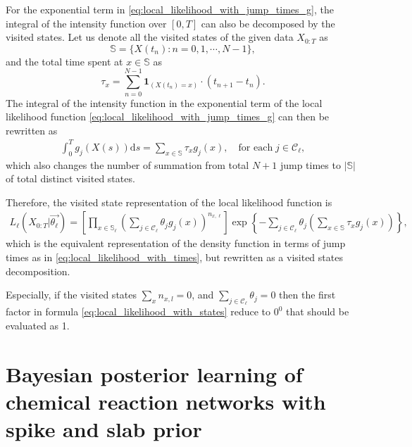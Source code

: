 \documentclass[pdflatex,sn-mathphys-num]{sn-jnl}%
\def\dd{\text{d}}
\theoremstyle{thmstyleone}%
\theoremstyle{thmstyletwo}%
\theoremstyle{thmstylethree}%
\begin{document}
For the exponential term in \eqref{eq:local_likelihood_with_jump_times_g}, the integral of the intensity function over $[0, T]$ can also be decomposed by the visited states. Let us denote all the visited states of the given data $X_{0:T}$ as 
\[\mathbb{S} = \{ X(t_n): n = 0, 1, \cdots, N-1 \},\] 
and the total time spent at $x \in \mathbb{S}$ as 
\[
\tau_{x} = \sum_{n=0}^{N-1} \mathbf{1}_{(X(t_n) = x)} \cdot (t_{n+1} - t_n).
\]
The integral of the intensity function in the exponential term of the local likelihood function \eqref{eq:local_likelihood_with_jump_times_g} can then be rewritten as
\begin{align}
    \int_0^T g_{j}(X(s))\dd s = \sum_{x \in \mathbb{S} } \tau_x  g_{j}(x) ,\quad \text{for each}\; j \in \mathcal{C}_{\ell},
\end{align} 
which also changes the number of summation from total $N+1$ jump times to $\left|\mathbb{S}\right|$ of total distinct visited states. 

Therefore, the visited state representation of the local likelihood function is 
\begin{equation}
    \begin{aligned}
    L_{\ell}\left(X_{0:T} \big| \overrightarrow{\theta_\ell}\right) = \left[\prod_{x \in \mathbb{S}_\ell}  \left(  \sum_{j \in \mathcal{C}_\ell } \theta_{j} g_{j} \left( x\right) \right)^{n_{x, \ell}} \right] 
\exp\left\{ -  \sum_{j \in \mathcal{C}_\ell } \theta_{j} \left(   \sum_{x \in \mathbb{S}} \tau_{x}  g_{j}(x)    \right) \right\} ,
\label{eq:local_likelihood_with_states}
\end{aligned}
\end{equation}
which is the equivalent representation of the density function in terms of jump times as in \eqref{eq:local_likelihood_with_times}, but rewritten as a visited states decomposition.


Especially, if the visited states $\sum_x n_{x,l}=0$, and $\sum_{j \in \mathcal{C}_\ell } \theta_{j}=0$ then the first factor in formula \ref{eq:local_likelihood_with_states} reduce to $0^0$ that should be evaluated as 1. 



\section{Bayesian posterior learning of chemical reaction networks with spike and slab prior}

\end{document}
